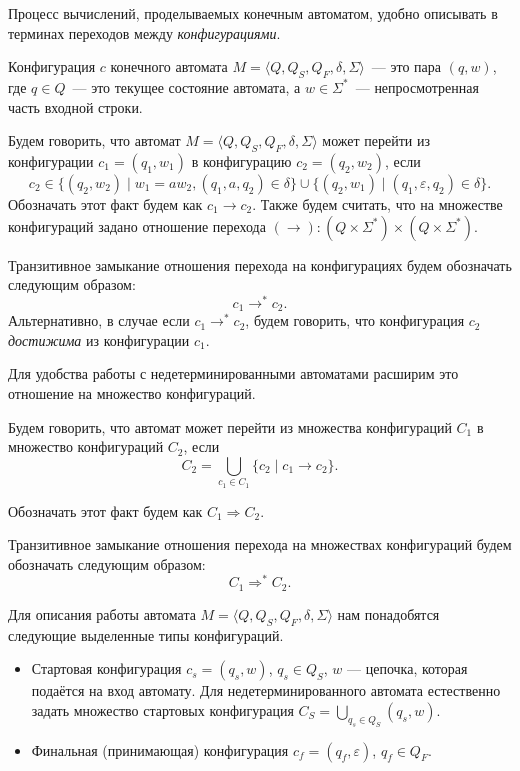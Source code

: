 Процесс вычислений, проделываемых конечным автоматом, удобно описывать в терминах переходов между \emph{конфигурациями}.

\begin{definition}[Конфигурация]
    Конфигурация $c$ конечного автомата $M = \langle Q, Q_S, Q_F, \delta, \Sigma \rangle$~--- это пара $(q, w)$, где $q\in Q$~--- это текущее состояние автомата, а $w \in \Sigma^*$~--- непросмотренная часть входной строки.
\end{definition}

\begin{definition}
    Будем говорить, что автомат $M = \langle Q, Q_S, Q_F, \delta, \Sigma \rangle$ может перейти из конфигурации $c_1 = (q_1, w_1)$ в конфигурацию $c_2 = (q_2, w_2)$, если
    \[c_2 \in \{(q_2,w_2) \mid w_1 = aw_2, (q_1,a, q_2) \in \delta\} \cup \{(q_2,w_1) \mid (q_1, \varepsilon, q_2) \in \delta\}.\]
    Обозначать этот факт будем как $c_1 \to c_2$.
    Также будем считать, что на множестве конфигураций задано отношение перехода $(\to):(Q \times \Sigma^*)\times(Q \times \Sigma^*)$.
    
\end{definition}

\begin{definition}
    Транзитивное замыкание отношения перехода на конфигурациях будем обозначать следующим образом: $$ c_1 \to^* c_2. $$
    Альтернативно, в случае если $c_1 \to^* c_2$, будем говорить, что конфигурация $c_2$ \textit{достижима} из конфигурации $c_1$.
\end{definition}

Для удобства работы с недетерминированными автоматами расширим это отношение на множество конфигураций.

\begin{definition}
Будем говорить, что автомат может перейти из множества конфигураций $C_1$ в множество конфигураций $C_2$, если 
$$C_2 = \bigcup_{c_1 \in C_1} \{c_2 \mid c_1 \to c_2 \}.$$

Обозначать этот факт будем как  $C_1 \Rightarrow C_2 $.
\end{definition}

\begin{definition}
Транзитивное замыкание отношения перехода на множествах конфигураций будем обозначать следующим образом: $$ C_1 \Rightarrow^* C_2. $$
\end{definition}

Для описания работы автомата $M = \langle Q, Q_S, Q_F, \delta, \Sigma \rangle$ нам понадобятся следующие выделенные типы конфигураций.
\begin{itemize}
    \item Стартовая конфигурация $c_s = (q_s,w)$, $q_s \in Q_S$, $w$ --- цепочка, которая подаётся на вход автомату. 
    Для недетерминированного автомата естественно задать множество стартовых конфигурация $C_S = \bigcup_{q_s \in Q_S} (q_s,w)$.
    \item Финальная (принимающая) конфигурация $c_f = (q_f,\varepsilon)$, $q_f \in Q_F$.
\end{itemize}

